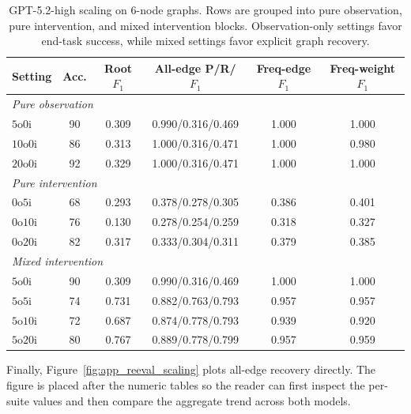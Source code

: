 \begin{table}[!ht]
\centering
\small
\setlength{\tabcolsep}{4pt}
\begin{tabular}{lccccc}
\toprule
Setting & Acc. & Root \(F_1\) & All-edge P/R/\(F_1\) & Freq-edge \(F_1\) & Freq-weight \(F_1\) \\
\midrule
\multicolumn{6}{l}{\textit{Pure observation}} \\
\(5\mathrm{o}0\mathrm{i}\) & 90 & 0.309 & 0.990/0.316/0.469 & 1.000 & 1.000 \\
\(10\mathrm{o}0\mathrm{i}\) & 86 & 0.313 & 1.000/0.316/0.471 & 1.000 & 0.980 \\
\(20\mathrm{o}0\mathrm{i}\) & 92 & 0.329 & 1.000/0.316/0.471 & 1.000 & 1.000 \\
\midrule
\multicolumn{6}{l}{\textit{Pure intervention}} \\
\(0\mathrm{o}5\mathrm{i}\) & 68 & 0.293 & 0.378/0.278/0.305 & 0.386 & 0.401 \\
\(0\mathrm{o}10\mathrm{i}\) & 76 & 0.130 & 0.278/0.254/0.259 & 0.318 & 0.327 \\
\(0\mathrm{o}20\mathrm{i}\) & 82 & 0.317 & 0.333/0.304/0.311 & 0.379 & 0.385 \\
\midrule
\multicolumn{6}{l}{\textit{Mixed intervention}} \\
\(5\mathrm{o}0\mathrm{i}\) & 90 & 0.309 & 0.990/0.316/0.469 & 1.000 & 1.000 \\
\(5\mathrm{o}5\mathrm{i}\) & 74 & 0.731 & 0.882/0.763/0.793 & 0.957 & 0.957 \\
\(5\mathrm{o}10\mathrm{i}\) & 72 & 0.687 & 0.874/0.778/0.793 & 0.939 & 0.920 \\
\(5\mathrm{o}20\mathrm{i}\) & 80 & 0.767 & 0.889/0.778/0.799 & 0.957 & 0.959 \\
\bottomrule
\end{tabular}
\caption{GPT-5.2-high scaling on 6-node graphs. Rows are grouped into pure observation, pure intervention, and mixed intervention blocks. Observation-only settings favor end-task success, while mixed settings favor explicit graph recovery.}
\label{tab:scaling_gpt52_6nodes_metrics}
\end{table}

Finally, Figure~\ref{fig:app_reeval_scaling} plots all-edge recovery directly.
The figure is placed after the numeric tables so the reader can first inspect
the per-suite values and then compare the aggregate trend across both models.


